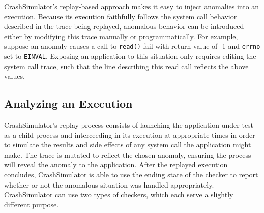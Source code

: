     CrashSimulator's replay-based approach makes it easy to inject anomalies
    into an execution.  
    Because its execution faithfully
    follows the system call behavior described in the trace being
    replayed, anomalous behavior can be introduced either by modifying
    this trace manually or programmatically.
    For example, suppose an anomaly causes a
    call to {\tt read()} fail with return value of -1 and {\tt errno} set to
    {\tt EINVAL}.  Exposing an application to this situation only requires
    editing the system call trace, such that the line describing this read call
    reflects the above values.



    \subsection{Analyzing an Execution}

    CrashSimulator's replay process consists of launching the
    application under test as a child process and interceeding in its execution
    at appropriate times in order to simulate the results and side effects of any
    system call the application might make.
    The trace is mutated to reflect the chosen anomaly, ensuring the process
    will reveal the anomaly to the application.
    After the replayed execution
    concludes, CrashSimulator is able to use the ending state of the checker to
    report whether or not the anomalous situation was handled appropriately.
    CrashSimulator
    can use two types of checkers, which each serve a slightly different purpose.



